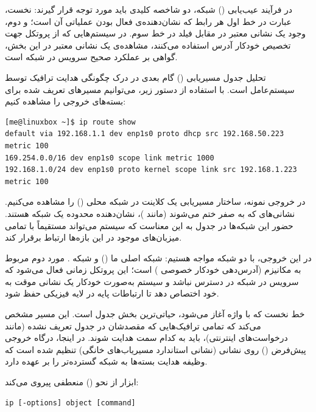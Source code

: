 در فرآیند عیب‌یابی () شبکه، دو شاخصه کلیدی باید مورد توجه قرار گیرند: نخست، عبارت  در خط اول هر رابط که نشان‌دهنده‌ی فعال بودن عملیاتی آن است؛ و دوم، وجود یک نشانی  معتبر در مقابل فیلد  در خط سوم. در سیستم‌هایی که از پروتکل  جهت تخصیص خودکار آدرس استفاده می‌کنند، مشاهده‌ی یک نشانی  معتبر در این بخش، گواهی بر عملکرد صحیح سرویس  در شبکه است.

تحلیل جدول مسیریابی () گام بعدی در درک چگونگی هدایت ترافیک توسط سیستم‌عامل است. با استفاده از دستور زیر، می‌توانیم مسیرهای تعریف شده برای بسته‌های خروجی را مشاهده کنیم:

\begin{latin}
\begin{lstlisting}
[me@linuxbox ~]$ ip route show
default via 192.168.1.1 dev enp1s0 proto dhcp src 192.168.50.223 metric 100
169.254.0.0/16 dev enp1s0 scope link metric 1000
192.168.1.0/24 dev enp1s0 proto kernel scope link src 192.168.1.223 metric 100
\end{lstlisting}
\end{latin}

در خروجی نمونه، ساختار مسیریابی یک کلاینت در شبکه محلی () را مشاهده می‌کنیم. نشانی‌های  که به صفر ختم می‌شوند (مانند )، نشان‌دهنده محدوده یک شبکه هستند. حضور این شبکه‌ها در جدول به این معناست که سیستم می‌تواند مستقیماً با تمامی میزبان‌های موجود در این بازه‌ها ارتباط برقرار کند.

در این خروجی، با دو شبکه مواجه هستیم: شبکه اصلی ما () و شبکه . مورد دوم مربوط به مکانیزم  (آدرس‌دهی خودکار خصوصی ) است؛ این پروتکل زمانی فعال می‌شود که سرویس  در شبکه در دسترس نباشد و سیستم به‌صورت خودکار یک نشانی موقت به خود اختصاص دهد تا ارتباطات پایه در لایه فیزیکی حفظ شود.

خط نخست که با واژه  آغاز می‌شود، حیاتی‌ترین بخش جدول است. این مسیر مشخص می‌کند که تمامی ترافیک‌هایی که مقصدشان در جدول تعریف نشده (مانند درخواست‌های اینترنتی)، باید به کدام سمت هدایت شوند. در اینجا، درگاه خروجی پیش‌فرض () روی نشانی  (نشانی استاندارد مسیریاب‌های خانگی) تنظیم شده است که وظیفه هدایت بسته‌ها به شبکه گسترده‌تر را بر عهده دارد.

ابزار  از نحو () منعطفی پیروی می‌کند:

\begin{latin}
\begin{lstlisting}
ip [-options] object [command]
\end{lstlisting}
\end{latin}

